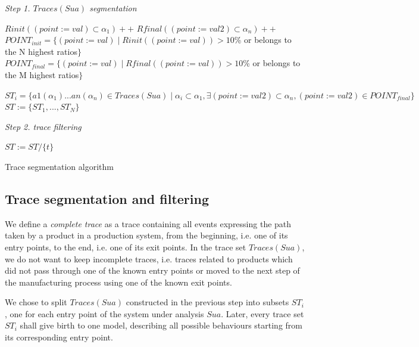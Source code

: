 \begin{algorithm}


\BlankLine
\emph{Step 1. $Traces(Sua)$ segmentation}

 {
$Rinit((point:=val)\subset \alpha_1)++$\;
$Rfinal((point:=val2)\subset \alpha_n)++$\;
}
$POINT_{init}=\{(point:=val) \mid Rinit((point:=val))>10$\% or belongs to the N highest ratios$\}$\;
$POINT_{final}=\{(point:=val) \mid Rfinal((point:=val))>10$\% or belongs to the M highest ratios$\}$\;
\BlankLine

 {
	$ST_i=\{a1(\alpha_1)...an(\alpha_n)\in Traces(Sua) \mid \alpha_i\subset \alpha_1, \exists (point:=val2)\subset \alpha_n, (point:=val2)\in POINT_{final}    \}$\;
}
$ST:=\{ST_1,...,ST_N\}$\;

\BlankLine
\emph{Step 2. trace filtering}

 {
	{
		$ST:= ST/ \{  t \}$\;
	}


	}

\caption{Trace segmentation algorithm}
\label{algo_traces}
\end{algorithm}

\subsection{Trace segmentation and filtering}

We define a \textit{complete trace} as a trace containing all
events expressing the path taken by a product in a production
system, from the beginning, i.e. one of its entry points, to the
end, i.e. one of its exit points. In the trace set $Traces(Sua)$,
we do not want to keep incomplete traces, i.e. traces related to
products which did not pass through one of the known entry points
or moved to the next step of the manufacturing process using one
of the known exit points.

We chose to split $Traces(Sua)$ constructed in the previous step
into subsets $ST_i$, one for each entry point of the system under
analysis $Sua$. Later, every trace set $ST_i$ shall give birth to
one model, describing all possible behaviours starting from its
corresponding entry point.

